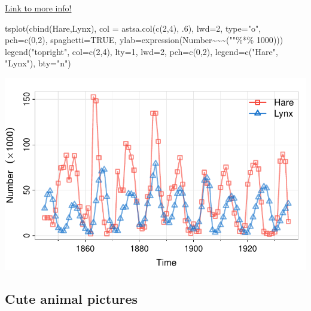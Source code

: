 \documentclass[
  letterpaper,
  DIV=11,
  numbers=noendperiod]{scrreprt}
\newenvironment{Shaded}{\begin{snugshade}}{\end{snugshade}}
\newcommand{\AttributeTok}[1]{\textcolor[rgb]{0.40,0.45,0.13}{#1}}
\newcommand{\ConstantTok}[1]{\textcolor[rgb]{0.56,0.35,0.01}{#1}}
\newcommand{\DecValTok}[1]{\textcolor[rgb]{0.68,0.00,0.00}{#1}}
\newcommand{\ErrorTok}[1]{\textcolor[rgb]{0.68,0.00,0.00}{#1}}
\newcommand{\FunctionTok}[1]{\textcolor[rgb]{0.28,0.35,0.67}{#1}}
\newcommand{\NormalTok}[1]{\textcolor[rgb]{0.00,0.23,0.31}{#1}}
\newcommand{\SpecialCharTok}[1]{\textcolor[rgb]{0.37,0.37,0.37}{#1}}
\newcommand{\StringTok}[1]{\textcolor[rgb]{0.13,0.47,0.30}{#1}}
\begin{document}
\href{https://www.gov.nt.ca/ecc/en/services/lynx/lynx-snowshoe-hare-cycle}{Link
to more info!}

\begin{Shaded}
\begin{Highlighting}[]
\FunctionTok{tsplot}\NormalTok{(}\FunctionTok{cbind}\NormalTok{(Hare,Lynx), }\AttributeTok{col =} \FunctionTok{astsa.col}\NormalTok{(}\FunctionTok{c}\NormalTok{(}\DecValTok{2}\NormalTok{,}\DecValTok{4}\NormalTok{), .}\DecValTok{6}\NormalTok{), }\AttributeTok{lwd=}\DecValTok{2}\NormalTok{, }\AttributeTok{type=}\StringTok{"o"}\NormalTok{, }\AttributeTok{pch=}\FunctionTok{c}\NormalTok{(}\DecValTok{0}\NormalTok{,}\DecValTok{2}\NormalTok{),}
        \AttributeTok{spaghetti=}\ConstantTok{TRUE}\NormalTok{, }\AttributeTok{ylab=}\FunctionTok{expression}\NormalTok{(Number}\SpecialCharTok{\textasciitilde{}}\ErrorTok{\textasciitilde{}\textasciitilde{}}\NormalTok{(}\StringTok{""}\SpecialCharTok{\%*\%} \DecValTok{1000}\NormalTok{)))}
\FunctionTok{legend}\NormalTok{(}\StringTok{"topright"}\NormalTok{, }\AttributeTok{col=}\FunctionTok{c}\NormalTok{(}\DecValTok{2}\NormalTok{,}\DecValTok{4}\NormalTok{), }\AttributeTok{lty=}\DecValTok{1}\NormalTok{, }\AttributeTok{lwd=}\DecValTok{2}\NormalTok{, }\AttributeTok{pch=}\FunctionTok{c}\NormalTok{(}\DecValTok{0}\NormalTok{,}\DecValTok{2}\NormalTok{), }\AttributeTok{legend=}\FunctionTok{c}\NormalTok{(}\StringTok{"Hare"}\NormalTok{, }\StringTok{"Lynx"}\NormalTok{), }\AttributeTok{bty=}\StringTok{"n"}\NormalTok{)}
\end{Highlighting}
\end{Shaded}

\includegraphics{LectureNotes/Lecture1_files/figure-pdf/ex-1-5-1.pdf}

\subsection{Cute animal pictures}\label{cute-animal-pictures}
\end{document}
